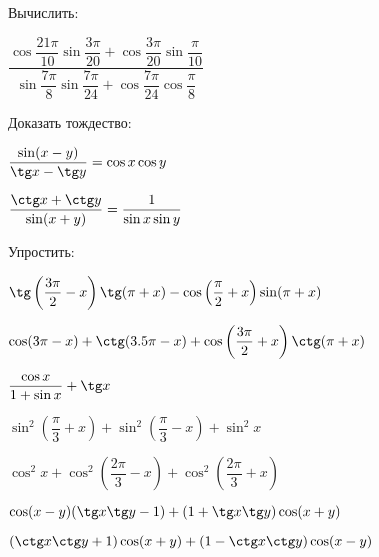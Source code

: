 %
%
\begin{consultation}
	\begin{listofex}
		\item Вычислить:
		\begin{enumcols}[itemcolumns=2]
			\item \( \dfrac{\cos\dfrac{21\pi}{10}\sin\dfrac{3\pi}{20}+\cos\dfrac{3\pi}{20}\sin\dfrac{\pi}{10}}{\sin\dfrac{7\pi}{8}\sin\dfrac{7\pi}{24}+\cos\dfrac{7\pi}{24}\cos\dfrac{\pi}{8}} \)
		\end{enumcols}
		\item Доказать тождество:
		\begin{enumcols}[itemcolumns=2]
			\item \( \dfrac{\sin(x-y)}{\tg x - \tg y}=\cos x \cos y \)
			\item \( \dfrac{\ctg x + \ctg y}{\sin(x+y)}=\dfrac{1}{\sin x \sin y} \)
		\end{enumcols}
		\item Упростить:
		\begin{enumcols}[itemcolumns=1]
			\item \( \tg\left( \dfrac{3\pi}{2}-x \right)\tg(\pi+x)-\cos\left( \dfrac{\pi}{2}+x \right)\sin(\pi+x) \)
			\item \( \cos(3\pi-x)+\ctg(3.5\pi-x)+\cos\left( \dfrac{3\pi}{2}+x \right)\ctg(\pi+x) \)
			\item \( \dfrac{\cos x}{1+\sin x}+\tg x \)
			\item \( \sin^2\left( \dfrac{\pi}{3}+x \right)+\sin^2\left( \dfrac{\pi}{3}-x \right)+\sin^2x \)
			\item \( \cos^2x+\cos^2\left( \dfrac{2\pi}{3}-x \right)+\cos^2\left( \dfrac{2\pi}{3}+x \right) \)
			\item \( \cos(x-y)(\tg x \tg y - 1)+(1+\tg x \tg y)\cos(x+y) \)
			\item \( (\ctg x \ctg y + 1)\cos(x+y)+(1-\ctg x \ctg y)\cos(x-y) \)
		\end{enumcols}
		\item {}
		\item {}
		\item {}
		\item {}
		\item {}
		\item {}
		\item {}
		\item {}
		\item {}
		\item {}
	\end{listofex}
\end{consultation}
